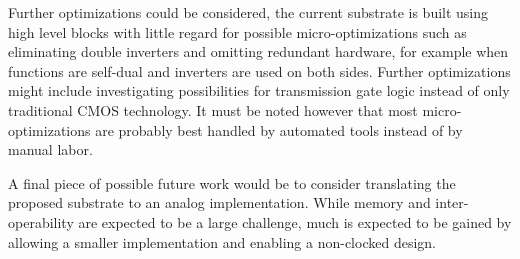 Further optimizations could be considered, the current substrate is built using high level blocks with little regard for possible micro-optimizations such as eliminating double inverters and omitting redundant hardware, for example when functions are self-dual and inverters are used on both sides\cite[Section 11.2.2.1]{Weste:2010:CVD:1841628}. Further optimizations might include investigating possibilities for transmission gate logic instead of only traditional \ac{CMOS} technology. It must be noted however that most micro-optimizations are probably best handled by automated tools instead of by manual labor.

A final piece of possible future work would be to consider translating the proposed substrate to an analog implementation. While memory and inter-operability are expected to be a large challenge, much is expected to be gained by allowing a smaller implementation and enabling a non-clocked design.
